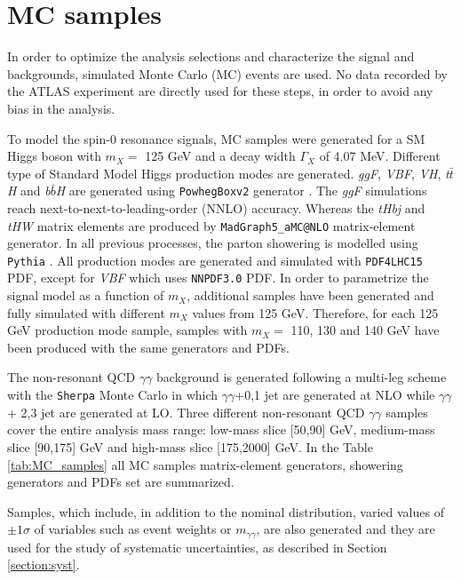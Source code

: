 \documentclass[a4paper, oneside, 11pt, openright]{book}
\begin{document}
 		\section{MC samples}
			In order to optimize the analysis selections and characterize the signal and backgrounds, simulated Monte Carlo (MC) events are used. No data recorded by the ATLAS experiment are directly used for these steps, in order to avoid any bias in the analysis. 
			
			To model the spin-0 resonance signals, MC samples were generated for a SM Higgs boson with $m_X =$ 125 GeV and a decay width $\Gamma_X$ of 4.07 MeV. Different type of Standard Model Higgs production modes are generated. \textit{ggF}, \textit{VBF}, \textit{VH}, \textit{t$\bar{t}$H} and \textit{b$\bar{b}$H} are generated using \texttt{PowhegBoxv2} generator \cite{Pow_1,Pow_2,Pow_3,Pow_4}. The \textit{ggF} simulations reach next-to-next-to-leading-order (NNLO) accuracy. Whereas the \textit{tHbj} and \textit{tHW} matrix elements are produced by \texttt{MadGraph5\_aMC@NLO} matrix-element generator. In all previous processes, the parton showering is modelled using \texttt{Pythia} \cite{Pythia}. All production modes are generated and simulated with \texttt{PDF4LHC15} PDF, except for \textit{VBF} which uses \texttt{NNPDF3.0} PDF. In order to parametrize the signal model as a function of $m_X$, additional samples have been generated and fully simulated with different $m_X$ values from 125 GeV. Therefore, for each 125 GeV production mode sample, samples with $m_X =$ 110, 130 and 140 GeV have been produced with the same generators and PDFs.%
			
			The non-resonant QCD $\gamma\gamma$ background is generated following a multi-leg scheme with the \texttt{Sherpa} \cite{sherpa} Monte Carlo in which $\gamma\gamma$+0,1 jet are generated at NLO while $\gamma\gamma$+ 2,3 jet are generated at LO. Three different non-resonant QCD $\gamma\gamma$ samples cover the entire analysis mass range: low-mass slice [50,90] GeV, medium-mass slice [90,175] GeV and high-mass slice [175,2000] GeV. In the Table \ref{tab:MC_samples} all MC samples matrix-element generators, showering generators and PDFs set are summarized.
			
			Samples, which include, in addition to the nominal distribution, varied values of $\pm1\sigma$ of variables such as event weights or $m_{\gamma\gamma}$, are also generated and they are used for the study of systematic uncertainties, as described in Section \ref{section:syst}.
			
\end{document}
